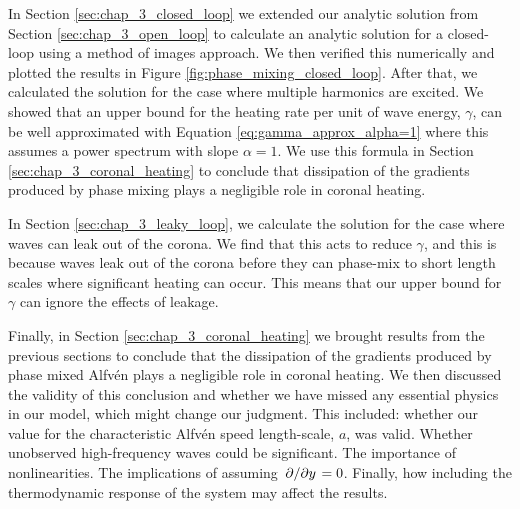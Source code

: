 In Section \ref{sec:chap_3_closed_loop} we extended our analytic solution from Section \ref{sec:chap_3_open_loop} to calculate an analytic solution for a closed-loop using a method of images approach. We then verified this numerically and plotted the results in Figure \ref{fig:phase_mixing_closed_loop}. After that, we calculated the solution for the case where multiple harmonics are excited. We showed that an upper bound for the heating rate per unit of wave energy, $\gamma$, can be well approximated with Equation \eqref{eq:gamma_approx_alpha=1} where this assumes a power spectrum with slope $\alpha=1$. We use this formula in Section \ref{sec:chap_3_coronal_heating} to conclude that dissipation of the gradients produced by phase mixing plays a negligible role in coronal heating.

In Section \ref{sec:chap_3_leaky_loop}, we calculate the solution for the case where waves can leak out of the corona. We find that this acts to reduce $\gamma$, and this is because waves leak out of the corona before they can phase-mix to short length scales where significant heating can occur. This means that our upper bound for $\gamma$ can ignore the effects of leakage.

Finally, in Section \ref{sec:chap_3_coronal_heating} we brought results from the previous sections to conclude that the dissipation of the gradients produced by phase mixed Alfv\'en plays a negligible role in coronal heating. We then discussed the validity of this conclusion and whether we have missed any essential physics in our model, which might change our judgment. This included: whether our value for the characteristic Alfv\'en speed length-scale, $a$, was valid. Whether unobserved high-frequency waves could be significant. The importance of nonlinearities. The implications of assuming $\pdv*{}{y}=0$. 
Finally, how including the thermodynamic response of the system may affect the results.


